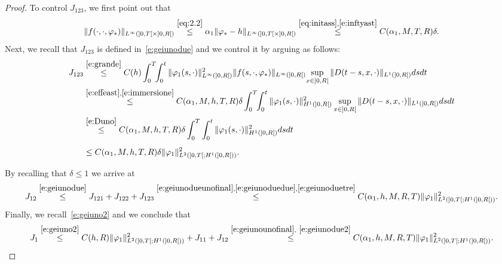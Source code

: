 \documentclass[11pt,leqno]{amsart}
\numberwithin{equation}{section}
\begin{document}
\begin{proof}
To control $J_{123}$, we first point out that
\begin{equation}
\label{e:effeast}
   \| f(\cdot, \cdot, {\varphi}_\ast) \|_{L^\infty (]0, T[ \times ]0, R[)}
   \stackrel{\eqref{eq:2.2}}{\leq}
   \alpha_1 \| {\varphi}_\ast - h \|_{L^\infty (]0, T[ \times ]0, R[)}
   \stackrel{\eqref{eq:initass},\eqref{e:inftyast}}{\leq}
   C(\alpha_1,M, T, R) \delta. 
\end{equation}
Next, we recall that $J_{123}$ is defined in~\eqref{e:geiunodue} and 
we control it by arguing as follows:
\begin{equation}
\label{e:geiunoduetre}
\begin{split}
     J_{123} & \stackrel{\eqref{e:grande}}{\leq} 
     C(h) \int_0^T  \! \!
  \int_0^t   
   \|  {\varphi}_1 (s, \cdot) \|^2_{L^\infty (]0, R[)}
   \| f(s, \cdot, {\varphi}_\ast) \|_{L^\infty ( ]0, R[)}
   \! \sup_{x \in ]0, R[}  \| D(t-s, x, \cdot ) \|_{L^1 (]0, R[) }
  ds dt \\
  & \stackrel{\eqref{e:effeast},\eqref{e:immersione}}{\leq}
    C(\alpha_1,M, h, T, R) \delta
   \int_0^T \! \!
  \int_0^t  
   \|  {\varphi}_1 (s, \cdot) \|^2_{H^1 (]0, R[)}
   \sup_{x \in ]0, R[}  \| D(t-s, x, \cdot ) \|_{L^1 (]0, R[) } 
   ds dt  \\
   &  \stackrel{\eqref{e:Duno}}{\leq}
   C(\alpha_1,M, h, T, R) \delta 
   \int_0^T 
  \int_0^t  
   \|  {\varphi}_1 (s, \cdot) \|^2_{H^1 (]0, R[)}ds dt \\
   & \leq C(\alpha_1,M, h, T, R) \delta 
    \|  {\varphi}_1  \|^2_{L^2 (]0, T[; H^1 (]0, R[))}. \phantom{\int}
\end{split}
\end{equation}
By recalling that $\delta \leq 1$ we arrive at
\begin{equation}
\label{e:geiunodue2}
 J_{12} \stackrel{\eqref{e:geiunodue}} \le
  J_{121}+J_{122} + J_{123} \stackrel{\eqref{e:geiunodueunofinal},\eqref{e:geiunoduedue},\eqref{e:geiunoduetre}}{\leq}
  C(\alpha_1, h, M, R, T) 
    \|  {\varphi}_1  \|^2_{L^2 (]0, T[; H^1 (]0, R[))}. 
\end{equation}
Finally, we recall~\eqref{e:geiuno2} and we conclude that
\begin{equation}
\label{e:geiuno3}
    J_1 \stackrel{\eqref{e:geiuno2}}{\leq} 
    C(h, R)  \|  {\varphi}_1  \|^2_{L^2 (]0, T[; H^1 (]0, R[))} + J_{11} + J_{12}
    \stackrel{\eqref{e:geiunounofinal},~\eqref{e:geiunodue2}}{\leq}
    C(\alpha_1, h, M, R, T) 
    \|  {\varphi}_1  \|^2_{L^2 (]0, T[; H^1 (]0, R[))}. 
\end{equation}

\end{proof}
\end{document}
